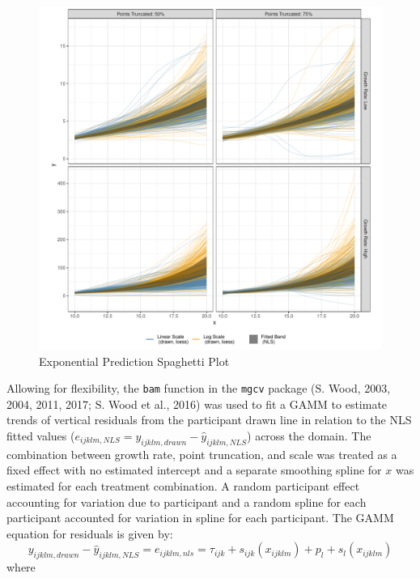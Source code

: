 \documentclass[print]{nuthesis}
\begin{document}
\begin{figure}[tbp]

{\centering \includegraphics[width=1\linewidth,]{thesis_files/figure-latex/exponential-yloess-spaghetti-plot-1} 

}

\caption{Exponential Prediction Spaghetti Plot}\label{fig:exponential-yloess-spaghetti-plot}
\end{figure}

Allowing for flexibility, the \texttt{bam} function in the \texttt{mgcv} package (S. Wood, 2003, 2004, 2011, 2017; S. Wood et al., 2016) was used to fit a GAMM to estimate trends of vertical residuals from the participant drawn line in relation to the NLS fitted values (\(e_{ijklm,NLS} = y_{ijklm,drawn} - \hat y_{ijklm,NLS}\)) across the domain.
The combination between growth rate, point truncation, and scale was treated as a fixed effect with no estimated intercept and a separate smoothing spline for \(x\) was estimated for each treatment combination.
A random participant effect accounting for variation due to participant and a random spline for each participant accounted for variation in spline for each participant.
The GAMM equation for residuals is given by:
\begin{equation}
y_{ijklm,drawn} - \hat y_{ijklm,NLS} = e_{ijklm,nls} = \tau_{ijk} + s_{ijk}(x_{ijklm}) + p_{l} + s_{l}(x_{ijklm})
\end{equation}
\noindent where
\end{document}
